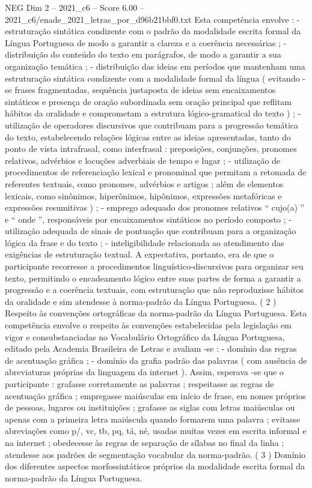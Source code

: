 \begin{textsample}{NEG Dim 2 – 2021\_c6 – Score 6.00 – 2021\_c6/enade\_2021\_letras\_por\_d96b21bbf0.txt}
Esta competência envolve : - estruturação sintática condizente com o padrão da modalidade escrita formal da Língua Portuguesa de modo a garantir a clareza e a coerência necessárias ; - distribuição do conteúdo do texto em parágrafos, de modo a garantir a sua organização temática ; - distribuição das ideias em períodos que mantenham uma estruturação sintática condizente com a modalidade formal da língua ( evitando -se frases fragmentadas, sequência justaposta de ideias sem encaixamentos sintáticos e presença de oração subordinada sem oração principal que reflitam hábitos da oralidade e comprometam a estrutura lógico-gramatical do texto ) ; - utilização de operadores discursivos que contribuam para a progressão temática do texto, estabelecendo relações lógicas entre as ideias apresentadas, tanto do ponto de vista intrafrasal, como interfrasal : preposições, conjunções, pronomes relativos, advérbios e locuções adverbiais de tempo e lugar ; - utilização de procedimentos de referenciação lexical e pronominal que permitam a retomada de referentes textuais, como pronomes, advérbios e artigos ; além de elementos lexicais, como sinônimos, hiperônimos, hipônimos, expressões metafóricas e expressões resumitivas ) ; - emprego adequado dos pronomes relativos “ cujo(a) ” e “ onde ”, responsáveis por encaixamentos sintáticos no período composto ; - utilização adequada de sinais de pontuação que contribuam para a organização lógica da frase e do texto ; - inteligibilidade relacionada ao atendimento das exigências de estruturação textual.
A expectativa, portanto, era de que o participante recorresse a procedimentos linguístico-discursivos para organizar seu texto, permitindo o encadeamento lógico entre suas partes de forma a garantir a progressão e a coerência textuais, com estruturação que não reproduzisse hábitos da oralidade e sim atendesse à norma-padrão da Língua Portuguesa. ( 2 ) Respeito às convenções ortográficas da norma-padrão da Língua Portuguesa.
Esta competência envolve o respeito às convenções estabelecidas pela legislação em vigor e consubstanciadas no Vocabulário Ortográfico da Língua Portuguesa, editado pela Academia Brasileira de Letras e avaliam -se : - domínio das regras de acentuação gráfica ; - domínio da grafia padrão das palavras ( com ausência de abreviaturas próprias da linguagem da internet ).
Assim, esperava -se que o participante : grafasse corretamente as palavras ; respeitasse as regras de acentuação gráfica ; empregasse maiúsculas em início de frase, em nomes próprios de pessoas, lugares ou instituições ; grafasse as siglas com letras maiúsculas ou apenas com a primeira letra maiúscula quando formarem uma palavra ; evitasse abreviações como p/, vc, tb, pq, tá, né, usadas muitas vezes em escrita informal e na internet ; obedecesse às regras de separação de sílabas no final da linha ; atendesse aos padrões de segmentação vocabular da norma-padrão. ( 3 ) Domínio dos diferentes aspectos morfossintáticos próprios da modalidade escrita formal da norma-padrão da Língua Portuguesa.

\end{textsample}
